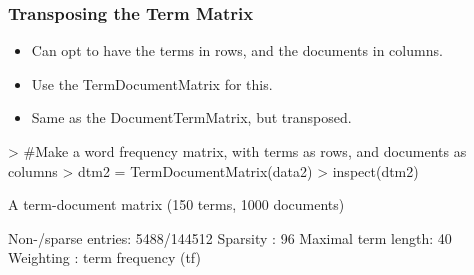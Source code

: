 \documentclass[compress,8pt]{beamer}
\begin{document}
\begin{frame}
\frametitle{Transposing the Term Matrix}    
\begin{itemize}
\item Can opt to have the terms in rows, and the documents in columns. 
\item Use the TermDocumentMatrix for this.
\item Same as the DocumentTermMatrix, but transposed.
\end{itemize}  
\begin{Schunk}
\begin{Sinput}
> #Make a word frequency matrix, with terms as rows, and documents as columns
> dtm2 = TermDocumentMatrix(data2)
> inspect(dtm2)
\end{Sinput}
A term-document matrix (150 terms, 1000 documents)

Non-/sparse entries: 5488/144512
Sparsity           : 96%
Maximal term length: 40 
Weighting          : term frequency (tf)


\end{Schunk}
\end{frame}
\end{document}
